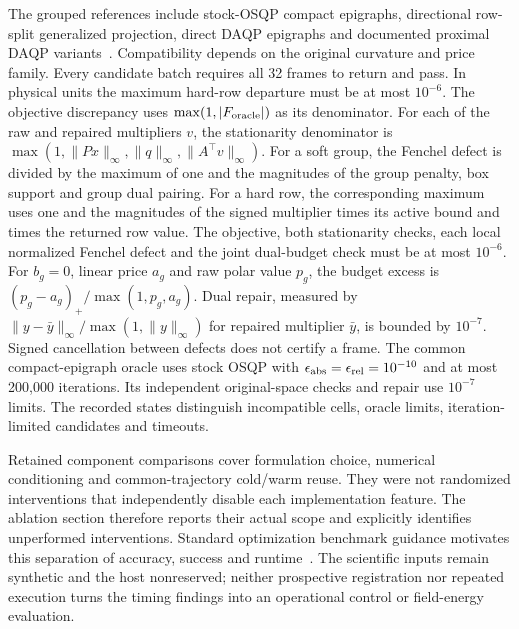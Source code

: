 The grouped references include stock-OSQP compact epigraphs,
directional row-split generalized projection, direct DAQP epigraphs
and documented proximal DAQP variants~\cite{daqpprox}. Compatibility
depends on the original curvature and price family. Every candidate batch requires all 32 frames to return and pass. In physical
units the maximum hard-row departure must be at most $10^{-6}$.
The objective discrepancy uses $\max(1,|F_{\rm oracle}|)$ as its
denominator. For each of the raw and repaired multipliers $v$,
the stationarity denominator is
$\max(1,\|Px\|_\infty,\|q\|_\infty,\|A^\top v\|_\infty)$.
For a soft group, the Fenchel defect is divided by the maximum of one
and the magnitudes of the group penalty, box support and group dual
pairing. For a hard row, the corresponding maximum uses one and the
magnitudes of the signed multiplier times its active bound and
times the returned row value. The objective, both stationarity
checks, each local normalized Fenchel defect and the joint dual-budget
check must be at most $10^{-6}$. For $b_g=0$, linear price $a_g$ and
raw polar value $p_g$, the budget excess is
$(p_g-a_g)_+/\max(1,p_g,a_g)$. Dual repair, measured by
$\|y-\bar y\|_\infty/\max(1,\|y\|_\infty)$ for repaired
multiplier $\bar y$, is bounded by $10^{-7}$.
Signed cancellation between defects does not certify a frame.
The common compact-epigraph oracle uses stock OSQP with
$\epsilon_{\rm abs}=\epsilon_{\rm rel}=10^{-10}$ and at most 200{,}000
iterations. Its independent original-space checks and repair use
$10^{-7}$ limits. The recorded states distinguish incompatible cells,
oracle limits, iteration-limited candidates and timeouts.

Retained component comparisons cover formulation choice, numerical
conditioning and common-trajectory cold/warm reuse. They were not
randomized interventions that independently disable each implementation
feature. The ablation section therefore reports their actual scope
and explicitly identifies unperformed interventions. Standard
optimization benchmark guidance motivates this separation of
accuracy, success and runtime~\cite{dolan,cutest}. The scientific
inputs remain synthetic and the host nonreserved; neither prospective
registration nor repeated execution turns the timing findings into
an operational control or field-energy evaluation.

